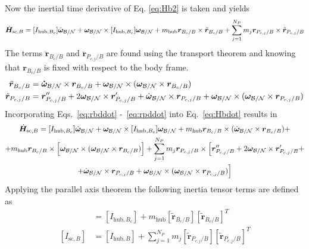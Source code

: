 Now the inertial time derivative of Eq. \eqref{eq:Hb2} is taken and yields
\begin{equation}
	\dot{\bm{H}}_{\text{sc},B} = [I_{\text{hub},B_c}] \dot{\bm\omega}_{\cal B/N} + \bm\omega_{\cal B/N} \times [I_{\text{hub},B_c}] \bm\omega_{\cal B/N} + m_{\text{hub}} \bm{r}_{B_c/B}\times\ddot{\bm r}_{B_c/B}+ \sum\limits_{j=1}^{N_P}m_j \bm r_{P_{c,j}/B}\times \ddot{\bm r}_{P_{c,j}/B}
	\label{eq:Hbdot}
\end{equation}
The terms $\ddot{\bm r}_{B_c/B}$ and $\ddot{\bm r}_{P_{c,j}/B}$ are found using the transport theorem and knowing that $\bm{r}_{B_c/B}$ is fixed with respect to the body frame.
\begin{align}
	\ddot{\bm r}_{B_c/B} &= \bm{\dot{\omega}}_{\cal B/N} \times \bm{r}_{B_c/B} + \bm\omega_{\cal B/N} \times (\bm\omega_{\cal B/N} \times \bm{r}_{B_c/B})
	\label{eq:rbddot}
	\\
	\ddot{\bm{r}}_{P_{c,j}/B}  &= \bm{r}''_{P_{c,j}/B} +2 \bm\omega_{\cal B/N} \times \bm{r}'_{P_{c,j}/B} + \dot{\bm\omega}_{\cal B/N} \times \bm{r}_{P_{c,j}/B}  +\bm\omega_{\cal B/N} \times (\bm\omega_{\cal B/N} \times \bm{r}_{P_{c,j}/B})
	\label{eq:rpddot}
\end{align}
Incorporating Eqs.~\eqref{eq:rbddot} -~\eqref{eq:rpddot} into Eq.~\eqref{eq:Hbdot} results in
\begin{multline}
	\dot{\bm{H}}_{\text{sc},B} = [I_{\text{hub},B_c}] \dot{\bm\omega}_{\cal B/N} + \bm\omega_{\cal B/N} \times [I_{\text{hub},B_c}] \bm\omega_{\cal B/N} + m_{\text{hub}} \bm{r}_{B_c/B}\times ( \dot{\bm\omega}_{\cal B/N}\times \bm{r}_{B_c/B})+\\ +m_{\text{hub}} \bm{r}_{B_c/B}\times \Bigl[ \bm\omega_{\cal B/N}\times (\bm\omega_{\cal B/N}\times \bm{r}_{B_c/B})\Bigr] + \sum\limits_{j=1}^{N_P}m_j \bm r_{P_{c,j}/B}\times \Bigl[\bm{r}''_{P_{c,j}/B} +2 \bm\omega_{\cal B/N} \times \bm{r}'_{P_{c,j}/B} + \\ + \dot{\bm\omega}_{\cal B/N} \times \bm{r}_{P_{c,j}/B} +\bm\omega_{\cal B/N} \times (\bm\omega_{\cal B/N} \times \bm{r}_{P_{c,j}/B})\Bigr]
	\label{eq:Hbdot2}
\end{multline}
Applying the parallel axis theorem the following inertia tensor terms are defined as
\begin{align}
	[I_{\text{hub},B}] &= [I_{\text{hub},B_c}] + m_{\text{hub}}[\bm{\tilde{r}}_{B_c/B}] [\bm{\tilde{r}}_{B_c/B}]^T
	\\
	[I_{\text{sc},B}] &= [I_{\text{hub},B}] + \sum\limits_{j=1}^{N_P} m_j [\tilde{\bm{r}}_{P_{c,j}/B}] [\tilde{\bm{r}}_{P_{c,j}/B}]^T
	\label{eq:IscB}
\end{align}
